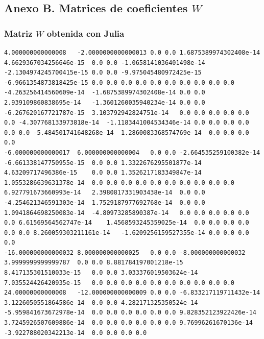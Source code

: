 \documentclass[12pt]{report} %
\begin{document}
\clearpage
\begin{landscape}
\chapter*{Anexo B. Matrices de coeficientes $W$}

\subsection*{Matriz $W$ obtenida con Julia}
\begin{lstlisting}[numbers=none, basicstyle=\ttfamily\tiny, captionpos=b, caption={Matriz de coeficientes $W = G^{-1}$ ($54\times54$) calculada con Julia, sin redondear.}, label=cod:W-julia]
4.000000000000008	-2.0000000000000013	0.0	0.0	1.6875389974302408e-14	4.6629367034256646e-15	0.0	0.0	-1.0658141036401498e-14	-2.1304974245700415e-15	0.0	0.0	-9.975045480972425e-15	-6.9661354873818425e-15	0.0	0.0	0.0	0.0	0.0	0.0	0.0	0.0	0.0	0.0	-4.263256414560609e-14	-1.6875389974302408e-14	0.0	0.0	2.939109860838695e-14	-1.3601260035940234e-14	0.0	0.0	-6.267620167721787e-15	3.103792942824751e-14	0.0	0.0	0.0	0.0	0.0	0.0	-4.307768133973818e-14	-1.1183441004534346e-14	0.0	0.0	0.0	0.0	0.0	0.0	-5.484501741648268e-14	1.2860083368574769e-14	0.0	0.0	0.0	0.0
-6.000000000000017	6.000000000000004	0.0	0.0	-2.664535259100382e-14	-6.661338147750955e-15	0.0	0.0	1.3322676295501877e-14	4.63209717496386e-15	0.0	0.0	1.3526217183349847e-14	1.0553286639631378e-14	0.0	0.0	0.0	0.0	0.0	0.0	0.0	0.0	0.0	0.0	6.927791673660993e-14	2.3980817331903438e-14	0.0	0.0	-4.254621346591303e-14	1.7529187977692768e-14	0.0	0.0	1.0941864698250083e-14	-4.80973285890387e-14	0.0	0.0	0.0	0.0	0.0	0.0	6.61569564562747e-14	1.4568593245359025e-14	0.0	0.0	0.0	0.0	0.0	0.0	8.260059303211161e-14	-1.6209256159527355e-14	0.0	0.0	0.0	0.0
-16.000000000000032	8.000000000000025	0.0	0.0	-8.000000000000032	3.9999999999999787	0.0	0.0	8.881784197001218e-15	8.417135301510033e-15	0.0	0.0	3.033376019503624e-14	7.035524426420935e-15	0.0	0.0	0.0	0.0	0.0	0.0	0.0	0.0	0.0	0.0	24.00000000000008	-12.000000000000009	0.0	0.0	-6.833217119711432e-14	3.1226050551864586e-14	0.0	0.0	4.282171325350524e-14	-5.959841673672978e-14	0.0	0.0	0.0	0.0	0.0	0.0	9.828352123922426e-14	3.7245926507609886e-14	0.0	0.0	0.0	0.0	0.0	0.0	9.76996261670136e-14	-3.922788020342213e-14	0.0	0.0	0.0	0.0

\end{lstlisting}
\end{landscape}
\end{document}
